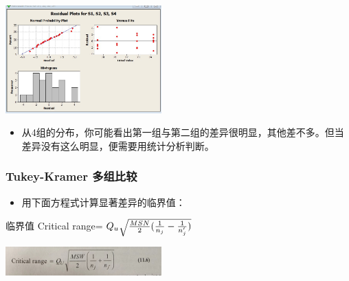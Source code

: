 
\includegraphics[width=6cm]{Anova3inOneScreenshot_2022-08-07_125131.jpg}

\begin{itemize}
\tightlist
\item
  从4组的分布，你可能看出第一组与第二组的差异很明显，其他差不多。但当差异没有这么明显，便需要用统计分析判断。
\end{itemize}

\hypertarget{tukey-kramer-ux591aux7ec4ux6bd4ux8f83}{%
\subsubsection{Tukey-Kramer
多组比较}\label{tukey-kramer-ux591aux7ec4ux6bd4ux8f83}}

\begin{itemize}
\tightlist
\item
  用下面方程式计算显著差异的临界值：
\end{itemize}

\begin{description}
\item[]
\begin{description}
\tightlist
\item[]
\textless{}\textgreater{}
\end{description}
\end{description}

临界值 Critical range=
\(Q_u \sqrt{{MSN \over 2} ({1\over n_j} - {1\over n_j '})}\)


\includegraphics[width=6cm]{微信截图_20221107134835.png}


